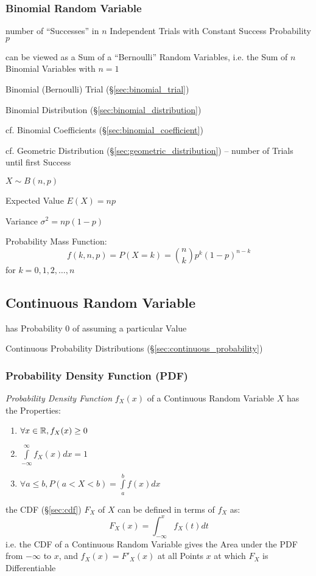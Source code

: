 \subsubsection{Binomial Random Variable}\label{sec:binomial_variable}

number of ``Successes'' in $n$ Independent Trials with Constant Success
Probability $p$

can be viewed as a Sum of a ``Bernoulli'' Random Variables, i.e. the Sum of $n$
Binomial Variables with $n = 1$

Binomial (Bernoulli) Trial (\S\ref{sec:binomial_trial})

Binomial Distribution (\S\ref{sec:binomial_distribution})

cf. Binomial Coefficients (\S\ref{sec:binomial_coefficient})

\fist cf. Geometric Distribution (\S\ref{sec:geometric_distribution}) -- number
of Trials until first Success

$X \sim B(n,p)$

Expected Value $E(X) = np$

Variance $\sigma^2 = np(1-p)$

Probability Mass Function:
\[
  f(k,n,p) = P(X = k) = \binom{n}{k} p^k (1-p)^{n-k}
\]
for $k = 0,1,2, \ldots, n$



\subsection{Continuous Random Variable}\label{sec:continuous_random_variable}

has Probability $0$ of assuming a particular Value

\fist Continuous Probability Distributions (\S\ref{sec:continuous_probability})



\subsubsection{Probability Density Function (PDF)}\label{sec:pdf}

\emph{Probability Density Function} $f_X(x)$ of a Continuous Random Variable $X$
has the Properties:
\begin{enumerate}
  \item $\forall x \in \mathbb{R}, f_X(x) \geq 0$
  \item $\int\limits_{-\infty}^{\infty} f_X(x) dx = 1$
  \item $\forall a \leq b, P (a < X < b) = \int\limits_a^b f(x) dx$
\end{enumerate}
the CDF (\S\ref{sec:cdf}) $F_X$ of $X$ can be defined in terms of $f_X$ as:
\[
  F_X(x) = \int_{-\infty}^x f_X(t)dt
\]
i.e. the CDF of a Continuous Random Variable gives the Area under the PDF from
$-\infty$ to $x$, and $f_X(x) = F'_X(x)$ at all Points $x$ at which $F_X$ is
Differentiable

